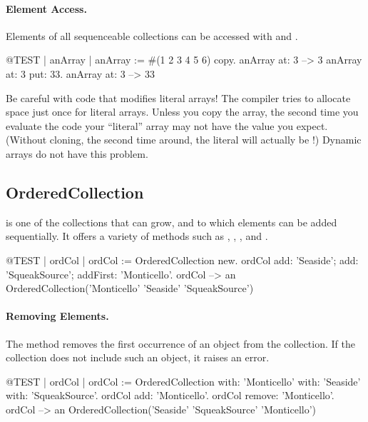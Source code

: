 \documentclass[a4paper,10pt,twoside]{book}
\begin{document}
\paragraph{Element Access.}
Elements of all sequenceable collections can be accessed with  and .

\begin{code}{@TEST | anArray |}
anArray := #(1 2 3 4 5 6) copy.
anArray at: 3 --> 3
anArray at: 3 put: 33.
anArray at: 3 --> 33
\end{code}

\noindent
Be careful with code that modifies literal arrays!
The compiler tries to allocate space just once for literal arrays.
Unless you copy the array, the second time you evaluate the code your ``literal'' array may not have the value you expect.
(Without cloning, the second time around, the literal  will actually be !)
Dynamic arrays do not have this problem.

\subsection{OrderedCollection}
 is one of the collections that can grow, and to which elements can be added sequentially. It offers a variety of methods such as , , , and . 

\begin{code}{@TEST | ordCol |}
ordCol := OrderedCollection new.
ordCol add: 'Seaside'; add: 'SqueakSource'; addFirst: 'Monticello'.
ordCol --> an OrderedCollection('Monticello' 'Seaside' 'SqueakSource')
\end{code}

\paragraph{Removing Elements.} The method   removes the first occurrence of an object from the collection. If the collection does not include such an object, it raises an error. 

\begin{code}{@TEST | ordCol | ordCol := OrderedCollection with: 'Monticello' with: 'Seaside' with: 'SqueakSource'.}
ordCol add: 'Monticello'.
ordCol remove: 'Monticello'.
ordCol --> an OrderedCollection('Seaside' 'SqueakSource' 'Monticello')
\end{code}
\end{document}
